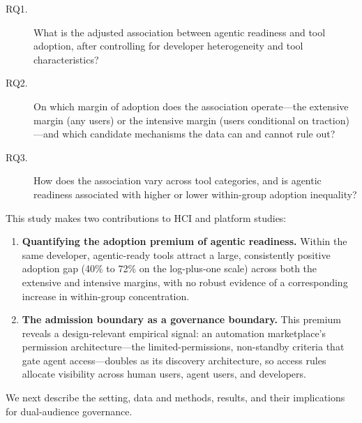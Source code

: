 \begin{description}
  \item[RQ1.] What is the adjusted association between agentic readiness and
    tool adoption, after controlling for developer heterogeneity and tool
    characteristics?
  \item[RQ2.] On which margin of adoption does the association operate---the
    extensive margin (any users) or the intensive margin (users conditional on
    traction)---and which candidate mechanisms the data can and cannot rule
    out?
  \item[RQ3.] How does the association vary across tool categories, and is
    agentic readiness associated with higher or lower within-group adoption
    inequality?
\end{description}

This study makes two contributions to HCI and platform studies:

\begin{enumerate}
  \item \textbf{Quantifying the adoption premium of agentic readiness.} Within
    the same developer, agentic-ready tools attract a large, consistently
    positive adoption gap (40\% to 72\% on the log-plus-one scale) across both
    the extensive and intensive margins, with no robust evidence of a
    corresponding increase in within-group concentration.

  \item \textbf{The admission boundary as a governance boundary.} This premium
    reveals a design-relevant empirical signal: an automation marketplace's
    permission architecture---the limited-permissions, non-standby criteria that
    gate agent access---doubles as its discovery architecture, so access rules
    allocate visibility across human users, agent users, and developers.
\end{enumerate}

We next describe the setting, data and methods, results, and their
implications for dual-audience governance.
